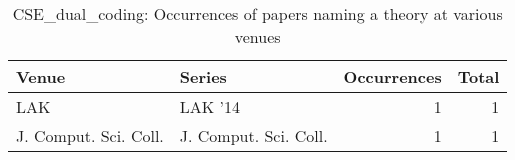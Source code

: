 \begin{table*}[t]
\begin{tabular}{llrr}
Venue & Series & Occurrences & Total\\\hline
\multirow{1}{*}{LAK } & LAK '14 & 1 & \multirow{1}{*}{1}\\
\multirow{1}{*}{J. Comput. Sci. Coll.} & J. Comput. Sci. Coll. & 1 & \multirow{1}{*}{1}\\
\end{tabular}
\caption{CSE\_dual\_coding: Occurrences of papers naming a theory at various venues}
\end{table*}